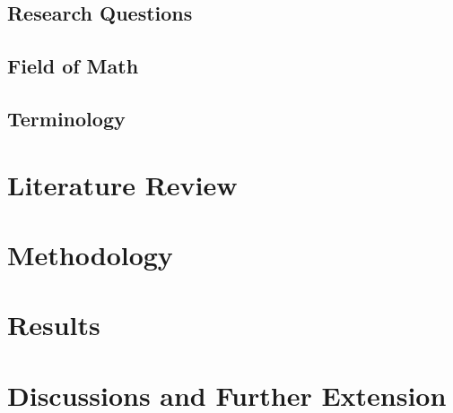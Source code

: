 \documentclass[12pt]{scrartcl}
\begin{document}
\subsection{Research Questions}
\subsection{Field of Math}
\subsection{Terminology}

\section{Literature Review}
\section{Methodology}
\section{Results}
\section{Discussions and Further Extension}
\end{document}
